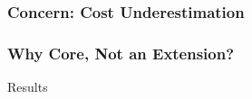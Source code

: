 \documentclass{beamer}
\begin{document}
\begin{frame}\frametitle{Concern: Cost Underestimation}
%
%
%
\end{frame}

\begin{frame}\frametitle{Why Core, Not an Extension?}
%
%
%
\end{frame}


\begin{frame}
\vspace*{\fill}\begin{center}
\huge{Results}
\end{center}\vspace*{\fill}
\end{frame}
\end{document}
